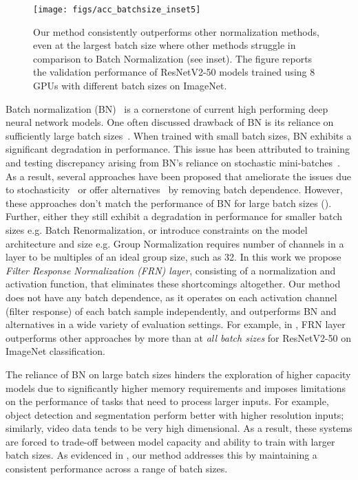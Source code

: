 \documentclass[10pt,twocolumn,letterpaper]{article}
\newcommand{\papername}{FRN}
\newcommand{\batchnorm}{BN}
\begin{document}
\begin{figure}[t]
\begin{center}
   \texttt{[image: figs/acc\_batchsize\_inset5]}
\end{center}
\vspace{-0.5cm}
   \caption{Our method consistently outperforms other normalization methods, even at the largest batch size where other methods struggle in comparison to Batch Normalization (see inset). The figure reports the validation performance of ResNetV2-50 models trained using 8 GPUs with different batch sizes on ImageNet.}
\label{fig:acc_batchsize}
\vspace{-0.5cm}
\end{figure}


Batch normalization (BN)~\cite{batchnorm} is a cornerstone of current high performing deep neural network models. One often discussed drawback of \batchnorm{} is its reliance on sufficiently large batch sizes~\cite{batchrenorm, groupnorm, evalnorm}. When trained with small batch sizes, \batchnorm{} exhibits a significant degradation in performance.
This issue has been attributed to training and testing discrepancy arising from \batchnorm{}'s reliance on stochastic mini-batches~\cite{evalnorm}. As a result, several approaches have been proposed that ameliorate the issues due to stochasticity~\cite{batchrenorm, evalnorm} or offer alternatives~\cite{groupnorm, layernorm} by removing batch dependence.
However, these approaches don't match the performance of \batchnorm{} for large batch sizes (). Further, either they  still exhibit a degradation in performance for smaller batch sizes e.g. Batch Renormalization, or introduce constraints on the model architecture and size e.g. Group Normalization requires number of channels in a layer to be multiples of an ideal group size, such as 32.
In this work we propose \emph{Filter Response Normalization (\papername{}) layer}, consisting of a normalization and activation function, that eliminates these shortcomings altogether. Our method does not have any batch dependence, as it operates on each activation channel (filter response) of each batch sample independently, and outperforms \batchnorm{} and alternatives in a wide variety of evaluation settings. For example, in  , \papername{} layer outperforms other approaches by more than  at \emph{all batch sizes} for ResNetV2-50 on ImageNet classification.


The reliance of \batchnorm{} on large batch sizes hinders the exploration of higher capacity models due to significantly higher memory requirements and imposes limitations on the performance of tasks that need to process larger inputs. For example, object detection and segmentation perform better with higher resolution inputs; similarly, video data tends to be very high dimensional. As a result, these systems are forced to trade-off between model capacity and ability to train with larger batch sizes. As evidenced in , our method addresses this by maintaining a consistent performance across a range of batch sizes.
\end{document}
